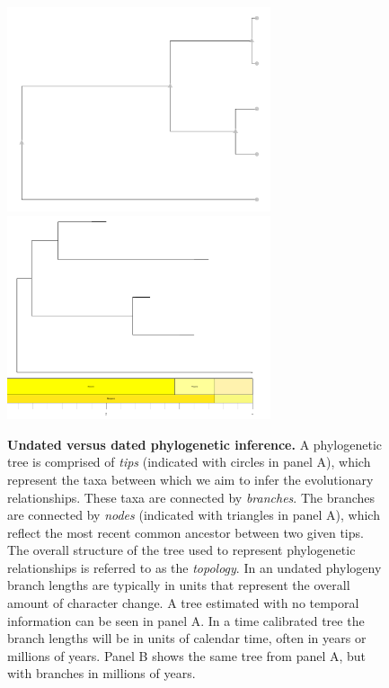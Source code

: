 \documentclass[11pt]{article}
\newcommand{\rw}[1]{{\textcolor{red}{[RW: #1]}}} %
\begin{document}
\begin{figure}[h!]

\centering

\includegraphics[height=6cm, width=7.75cm]{figures/UnscaledTree.pdf} \includegraphics[height=6cm, width=7.75cm]{figures/Scaley.pdf}
\label{fig:undated}

\caption{\textbf{Undated versus dated phylogenetic inference.}
A phylogenetic tree is comprised of \textit{tips} (indicated with circles in panel A), which represent the taxa between which we aim to infer the evolutionary relationships.
These taxa are connected by \textit{branches}. %
The branches are connected by \textit{nodes} (indicated with triangles in panel A), which reflect the most recent common ancestor between two given tips. 
The overall structure of the tree used to represent phylogenetic relationships is referred to as the \textit{topology}.
In an undated phylogeny branch lengths are typically in units that represent the overall amount of character change.
A tree estimated with no temporal information can be seen in panel A.
In a time calibrated tree %
the branch lengths will be in units of calendar time, often in years or millions of years. %
Panel B shows the same tree from panel A, but with branches in millions of years.}
\label{fig:undated}

\end{figure}
\end{document}
